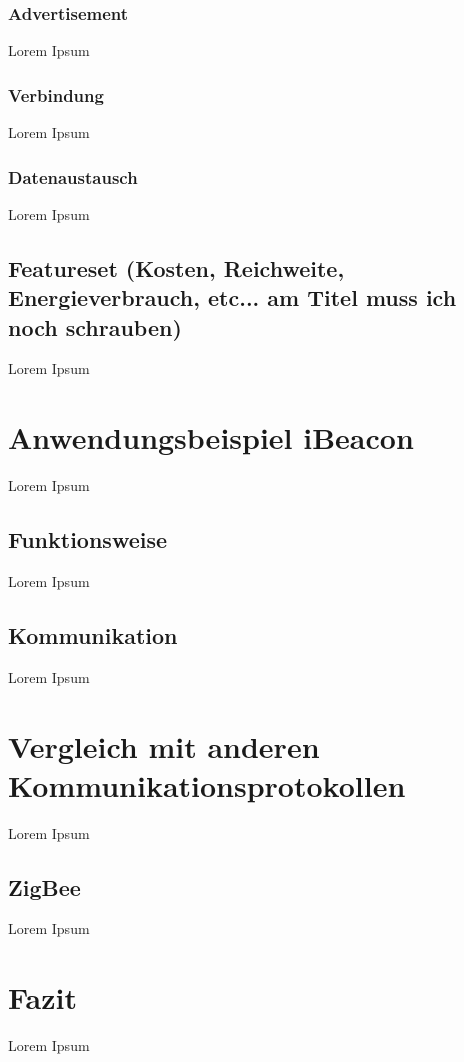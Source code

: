 \subsubsection{Advertisement}
\label{sss:funktionsweise:advertisement}

Lorem Ipsum

\subsubsection{Verbindung}
\label{sss:funktionsweise:verbindung}

Lorem Ipsum

\subsubsection{Datenaustausch}
\label{sss:funktionsweise:datenaustausch}

Lorem Ipsum

\subsection{Featureset (Kosten, Reichweite, Energieverbrauch, etc... am Titel muss ich noch schrauben)}
\label{ss:funktionsweise:Featureset}

Lorem Ipsum

\section{Anwendungsbeispiel iBeacon}
\label{s:ibeacon}

Lorem Ipsum

\subsection{Funktionsweise}
\label{ss:ibeacon:funktionsweise}

Lorem Ipsum

\subsection{Kommunikation}
\label{ss:ibeacon:kommunikation}

Lorem Ipsum

\section{Vergleich mit anderen Kommunikationsprotokollen}
\label{s:vergleich}

Lorem Ipsum

\subsection{ZigBee}
\label{ss:vergleich:zigbee}

Lorem Ipsum

\section{Fazit}
\label{s:fazit}

Lorem Ipsum
